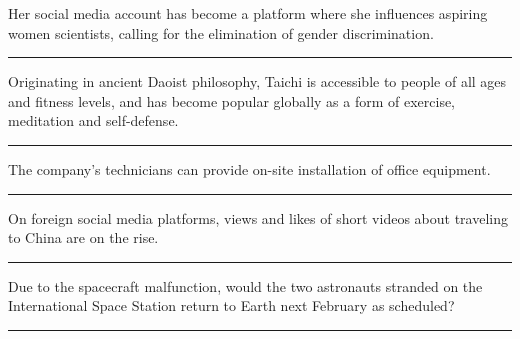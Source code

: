 \documentclass[11pt,a4paper]{article}
\newcommand{\num}[1]{\makebox[1.9em][r]{#1.}\hspace{0.3em}}
\newcommand{\wline}{\noindent\rule{\linewidth}{0.4pt}}
\begin{document}
\begin{minipage}{\linewidth}

\num{19}Her social media account has become a platform where she influences aspiring women scientists, calling for the elimination of gender discrimination.

\vspace{0.25em}

\wline

\end{minipage}

\begin{minipage}{\linewidth}

\num{20}Originating in ancient Daoist philosophy, Taichi is accessible to people of all ages and fitness levels, and has become popular globally as a form of exercise, meditation and self-defense.

\vspace{0.25em}

\wline

\end{minipage}

\vspace{0.35em}\vspace{0.15em}

\begin{minipage}{\linewidth}

\num{21}The company’s technicians can provide on-site installation of office equipment.

\vspace{0.25em}

\wline

\end{minipage}

\begin{minipage}{\linewidth}

\num{22}On foreign social media platforms, views and likes of short videos about traveling to China are on the rise.

\vspace{0.25em}

\wline

\end{minipage}

\begin{minipage}{\linewidth}

\num{23}Due to the spacecraft malfunction, would the two astronauts stranded on the International Space Station return to Earth next February as scheduled?

\vspace{0.25em}

\wline

\end{minipage}
\end{document}
